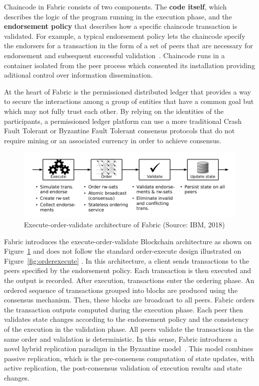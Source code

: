 Chaincode in Fabric consists of two components. The \textbf{code itself}, which
describes the logic of the program running in the execution phase, and the
\textbf{endorsement policy} that describes how a specific chaincode transaction
is validated. For example, a typical endorsement policy lets the chaincode
specify the endorsers for a transaction in the form of a set of peers that are
necessary for endorsement and subsequent successful
validation~\cite{Androulaki2018}. Chaincode runs in a container isolated from
the peer process which consented its installation providing aditional control
over information dissemination.

At the heart of Fabric is the permissioned distributed ledger that provides a
way to secure the interactions among a group of entities that have a common
goal but which may not fully trust each other. By relying on the identities of
the participants, a permissioned ledger platform can use a more traditional
Crash Fault Tolerant or Byzantine Fault Tolerant consensus protocols that do
not require mining or an associated currency in order to achieve consensus.

\begin{figure}[h]
  \centering
  \includegraphics[width=1\linewidth]{imgs/executeOrderValidate.png}
  \caption{\label{fig:executeorder} Execute-order-validate architecture of
  Fabric (Source: IBM, 2018)}
\end{figure}

Fabric introduces the execute-order-validate Blockchain architecture as shown
on Figure~\ref{fig:executeorder} and does not follow the standard order-execute
design illustrated on Figure~\ref{fig:orderexecute} \cite{Androulaki2018}. In
this architecture, a client sends transactions to the peers specified by the
endorsement policy. Each transaction is then executed and the output is
recorded. After execution, transactions enter the ordering phase. An ordered
sequence of transactions grouped into blocks are produced using the consensus
mechanism. Then, these blocks are broadcast to all peers. Fabric orders the
transaction outputs computed during the execution phase. Each peer then
validates state changes according to the endorsement policy and the consistency
of the execution in the validation phase. All peers validate the transactions
in the same order and validation is deterministic. In this sense, Fabric
introduces a novel hybrid replication paradigm in the Byzantine
model~\cite{Androulaki2018}. This model combines passive replication, which is
the pre-consensus computation of state updates, with active replication, the
post-consensus validation of execution results and state changes.

